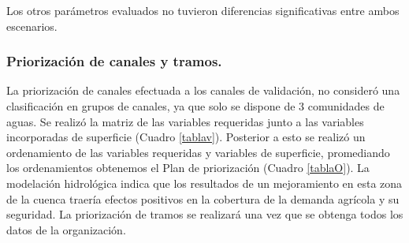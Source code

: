 \documentclass[]{article}
\begin{document}
Los otros parámetros evaluados no tuvieron diferencias significativas entre ambos escenarios.


\subsubsection{Priorización de canales y tramos.}

La priorización de canales efectuada a los canales de validación, no consideró una clasificación en grupos de canales, ya que solo se dispone de 3 comunidades de aguas. Se realizó la matriz de las variables requeridas junto a las variables incorporadas de superficie (Cuadro \ref{tablav}). Posterior a esto se realizó un ordenamiento de las variables requeridas y variables de superficie, promediando los ordenamientos obtenemos el Plan de priorización (Cuadro \ref{tablaO}). La modelación hidrológica indica que los resultados de un mejoramiento en esta zona de la cuenca traería efectos positivos en la cobertura de la demanda agrícola y su seguridad. La priorización de tramos se realizará una vez que se obtenga todos los datos de la organización. 
\end{document}
